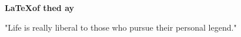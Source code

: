 \documentclass[a4paper]{article}
\begin{document}
\begin{center}
\begin{large}
\textbf{\LaTeX\Thought of thed ay}\\
\end{large}

\end{center}

"Life is really liberal to those who pursue their personal legend."
\end{document}
